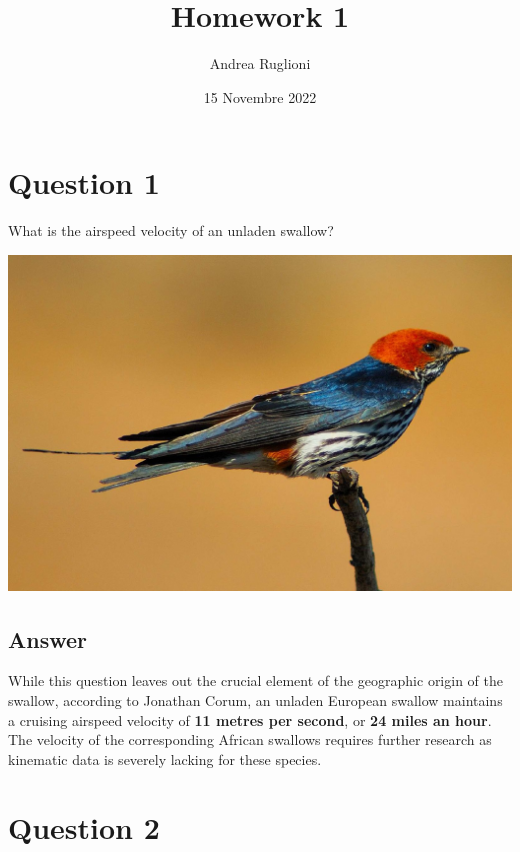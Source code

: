 \documentclass[
	12pt, %
]{fphw}
\title{Homework 1} %
\author{Andrea Ruglioni} %
\date{15 Novembre 2022} %
\institute{Politecnico di Torino} %
\begin{document}
\maketitle %


\section*{Question 1}

\begin{problem}
	What is the airspeed velocity of an unladen swallow?
\end{problem}
\begin{center}
	\includegraphics[width=0.5\columnwidth]{figures/swallow.jpg} %
\end{center}


\subsection*{Answer}

While this question leaves out the crucial element of the geographic origin of the swallow, according to Jonathan Corum, an unladen European swallow maintains a cruising airspeed velocity of \textbf{11 metres per second}, or \textbf{24 miles an hour}. The velocity of the corresponding African swallows requires further research as kinematic data is severely lacking for these species.


\section*{Question 2}
\end{document}
